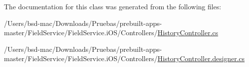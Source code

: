 The documentation for this class was generated from the following files\+:\begin{DoxyCompactItemize}
\item 
/\+Users/bsd-\/mac/\+Downloads/\+Pruebas/prebuilt-\/apps-\/master/\+Field\+Service/\+Field\+Service.\+i\+O\+S/\+Controllers/\hyperlink{_history_controller_8cs}{History\+Controller.\+cs}\item 
/\+Users/bsd-\/mac/\+Downloads/\+Pruebas/prebuilt-\/apps-\/master/\+Field\+Service/\+Field\+Service.\+i\+O\+S/\+Controllers/\hyperlink{_history_controller_8designer_8cs}{History\+Controller.\+designer.\+cs}\end{DoxyCompactItemize}

